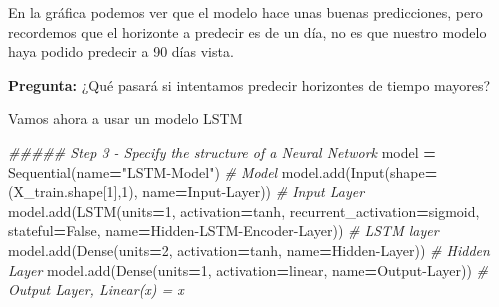 \documentclass[
  a4paper,
  DIV=11,
  numbers=noendperiod]{scrreprt}
\newenvironment{Shaded}{\begin{snugshade}}{\end{snugshade}}
\newcommand{\CommentTok}[1]{\textcolor[rgb]{0.56,0.35,0.01}{\textit{#1}}}
\newcommand{\DecValTok}[1]{\textcolor[rgb]{0.00,0.00,0.81}{#1}}
\newcommand{\NormalTok}[1]{#1}
\newcommand{\OperatorTok}[1]{\textcolor[rgb]{0.81,0.36,0.00}{\textbf{#1}}}
\newcommand{\StringTok}[1]{\textcolor[rgb]{0.31,0.60,0.02}{#1}}
\newcommand{\VariableTok}[1]{\textcolor[rgb]{0.00,0.00,0.00}{#1}}
\begin{document}
En la gráfica podemos ver que el modelo hace unas buenas predicciones,
pero recordemos que el horizonte a predecir es de un día, no es que
nuestro modelo haya podido predecir a 90 días vista.

\textbf{Pregunta:} ¿Qué pasará si intentamos predecir horizontes de
tiempo mayores?

Vamos ahora a usar un modelo LSTM

\begin{Shaded}
\begin{Highlighting}[numbers=left,,]

\CommentTok{\#\#\#\#\# Step 3 {-} Specify the structure of a Neural Network}
\NormalTok{model }\OperatorTok{=}\NormalTok{ Sequential(name}\OperatorTok{=}\StringTok{"LSTM{-}Model"}\NormalTok{) }\CommentTok{\# Model}
\NormalTok{model.add(Input(shape}\OperatorTok{=}\NormalTok{(X\_train.shape[}\DecValTok{1}\NormalTok{],}\DecValTok{1}\NormalTok{), name}\OperatorTok{=}\StringTok{\textquotesingle{}Input{-}Layer\textquotesingle{}}\NormalTok{)) }\CommentTok{\# Input Layer}
\NormalTok{model.add(LSTM(units}\OperatorTok{=}\DecValTok{1}\NormalTok{, activation}\OperatorTok{=}\StringTok{\textquotesingle{}tanh\textquotesingle{}}\NormalTok{, recurrent\_activation}\OperatorTok{=}\StringTok{\textquotesingle{}sigmoid\textquotesingle{}}\NormalTok{, stateful}\OperatorTok{=}\VariableTok{False}\NormalTok{, name}\OperatorTok{=}\StringTok{\textquotesingle{}Hidden{-}LSTM{-}Encoder{-}Layer\textquotesingle{}}\NormalTok{)) }\CommentTok{\# LSTM layer}
\NormalTok{model.add(Dense(units}\OperatorTok{=}\DecValTok{2}\NormalTok{, activation}\OperatorTok{=}\StringTok{\textquotesingle{}tanh\textquotesingle{}}\NormalTok{, name}\OperatorTok{=}\StringTok{\textquotesingle{}Hidden{-}Layer\textquotesingle{}}\NormalTok{)) }\CommentTok{\# Hidden Layer}
\NormalTok{model.add(Dense(units}\OperatorTok{=}\DecValTok{1}\NormalTok{, activation}\OperatorTok{=}\StringTok{\textquotesingle{}linear\textquotesingle{}}\NormalTok{, name}\OperatorTok{=}\StringTok{\textquotesingle{}Output{-}Layer\textquotesingle{}}\NormalTok{)) }\CommentTok{\# Output Layer, Linear(x) = x}



\end{Highlighting}
\end{Shaded}
\end{document}
